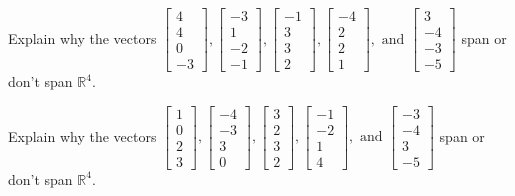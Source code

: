 \documentclass{article}
\begin{document}
\begin{exerciseStatement}
    Explain why the vectors \(\left[\begin{array}{r}
4 \\
4 \\
0 \\
-3
\end{array}\right] , \left[\begin{array}{r}
-3 \\
1 \\
-2 \\
-1
\end{array}\right] , \left[\begin{array}{r}
-1 \\
3 \\
3 \\
2
\end{array}\right] , \left[\begin{array}{r}
-4 \\
2 \\
2 \\
1
\end{array}\right] , \text{ and } \left[\begin{array}{r}
3 \\
-4 \\
-3 \\
-5
\end{array}\right]\) span or don't span \(\mathbb{R}^4\).



  
\end{exerciseStatement}

\begin{exerciseStatement}
    Explain why the vectors \(\left[\begin{array}{r}
1 \\
0 \\
2 \\
3
\end{array}\right] , \left[\begin{array}{r}
-4 \\
-3 \\
3 \\
0
\end{array}\right] , \left[\begin{array}{r}
3 \\
2 \\
3 \\
2
\end{array}\right] , \left[\begin{array}{r}
-1 \\
-2 \\
1 \\
4
\end{array}\right] , \text{ and } \left[\begin{array}{r}
-3 \\
-4 \\
3 \\
-5
\end{array}\right]\) span or don't span \(\mathbb{R}^4\).



  
\end{exerciseStatement}
\end{document}
